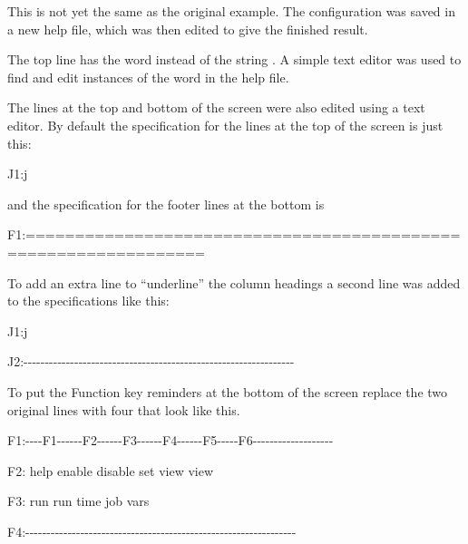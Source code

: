 This is not yet the same as the original example. The configuration was
saved in a new help file, which was then edited to give the finished
result.

The top line has the word  instead of the
string . A simple text editor was used
to find and edit instances of the word  in
the help file.

The lines at the top and bottom of the screen were also edited using a
text editor. By default the specification for the lines at the top of
the screen is just this:

\begin{expara}

J1:j

\end{expara}

and the specification for the footer lines at the bottom is

\begin{exparasmall}

F1:================================================================


\end{exparasmall}

To add an extra line to ``underline'' the
column headings a second line was added to the 
specifications like this:

\begin{exparasmall}

J1:j

J2:-{}-{}-{}-{}-{}-{}-{}-{}-{}-{}-{}-{}-{}-{}-{}-{}-{}-{}-{}-{}-{}-{}-{}-{}-{}-{}-{}-{}-{}-{}-{}-{}-{}-{}-{}-{}-{}-{}-{}-{}-{}-{}-{}-{}-{}-{}-{}-{}-{}-{}-{}-{}-{}-{}-{}-{}-{}-{}-{}-{}-{}-{}-{}-

\end{exparasmall}

To put the Function key reminders at the bottom of the screen replace
the two original lines with four that look like this.

\begin{exparasmall}

F1:-{}-{}-{}-F1-{}-{}-{}-{}-{}-F2-{}-{}-{}-{}-{}-F3-{}-{}-{}-{}-{}-F4-{}-{}-{}-{}-{}-F5-{}-{}-{}-{}-F6-{}-{}-{}-{}-{}-{}-{}-{}-{}-{}-{}-{}-{}-{}-{}-{}-{}-{}-

F2: help enable disable set view view

F3: run run time job vars

F4:-{}-{}-{}-{}-{}-{}-{}-{}-{}-{}-{}-{}-{}-{}-{}-{}-{}-{}-{}-{}-{}-{}-{}-{}-{}-{}-{}-{}-{}-{}-{}-{}-{}-{}-{}-{}-{}-{}-{}-{}-{}-{}-{}-{}-{}-{}-{}-{}-{}-{}-{}-{}-{}-{}-{}-{}-{}-{}-{}-{}-{}-{}-{}-

\end{exparasmall}

